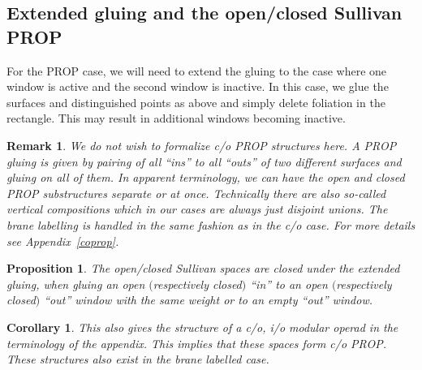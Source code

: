 \documentclass[pdftex]{sigma}
\newtheorem{prop}[thm]{Proposition}
\newtheorem{cor}[thm]{Corollary}
\newtheorem{rmk}[thm]{Remark}
\begin{document}
\subsection{Extended gluing and the open/closed Sullivan PROP}

For the PROP case, we will need to extend the gluing to the case
where one window is active and the second window is inactive.
In this case, we glue the surfaces and distinguished points as above and
simply delete foliation in the rectangle. This may result in additional windows becoming inactive.

\begin{rmk}
We do not wish to formalize c/o PROP structures here.  A PROP gluing is given by pairing of all ``ins''
to all ``outs'' of two dif\/ferent surfaces and gluing on all of them.
 In apparent terminology, we can have the open and closed PROP substructures separate or at once. Technically there are also so-called vertical compositions which in our cases are always just disjoint unions. The brane labelling is handled in the same fashion as in the c/o case.
For more details see  Appendix~\ref{coprop}.
\end{rmk}

\begin{prop}
The open/closed Sullivan spaces are  closed under the extended
gluing, when  gluing an open $($respectively closed$)$ ``in'' to an open
$($respectively closed$)$ ``out'' window
 with the same weight or to an empty ``out'' window.
\end{prop}

\begin{cor}
 This also gives the structure of a
c/o, i/o modular operad in the terminology of the appendix.
This implies that these spaces  form c/o PROP.
These structures also exist in the brane labelled case.
\end{cor}
\end{document}
